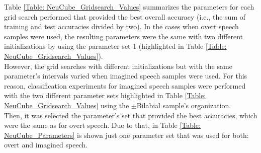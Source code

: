 Table \ref{Table: NeuCube_Gridsearch_Values} summarizes the parameters for each grid search performed that provided the best overall accuracy (i.e., the sum of training and test accuracies divided by two). In the cases when overt speech samples were used, the resulting parameters were the same with two different initializations by using the parameter set 1 (highlighted in Table \ref{Table: NeuCube_Gridsearch_Values}).\\

However, the grid searches with different initializations but with the same parameter's intervals varied when imagined speech samples were used. For this reason, classification experiments for imagined speech samples were performed with the two different parameter sets highlighted in Table \ref{Table: NeuCube_Gridsearch_Values} using the $\pm$Bilabial sample's organization.\\

Then, it was selected the parameter's set that provided the best accuracies, which were the same as for overt speech. Due to that, in Table \ref{Table: NeuCube_Parameters} is shown just one parameter set that was used for both: overt and imagined speech.\\
\pagebreak


